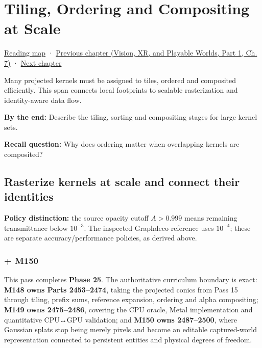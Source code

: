 \chapter{Tiling, Ordering and Compositing at Scale}\label{04-visual-computing-ii-ch039-tiling-ordering-and-compositing-at-scale}\hypertarget{04-visual-computing-ii-ch039}{}\label{stagechapter:04-visual-computing-ii-ch039}

\hypertarget{04-visual-computing-ii-ch039-tiling-ordering-and-compositing-at-scale}{}

\hyperref[volume-reading-map]{Reading map} · \href{../07-Vision-XR-and-Playable-Worlds-P01/main.pdf\#nameddest=04-visual-computing-ii-ch038-projecting-ellipsoids-into-screen-space-conics}{Previous chapter (Vision, XR, and Playable Worlds, Part 1, Ch. 7)} · \hyperref[04-visual-computing-ii-ch042]{Next chapter}

Many projected kernels must be assigned to tiles, ordered and composited efficiently. This span connects local footprints to scalable rasterization and identity-aware data flow.

\textbf{By the end:} Describe the tiling, sorting and compositing stages for large kernel sets.

\textbf{Recall question:} Why does ordering matter when overlapping kernels are composited?

\section{Rasterize kernels at scale and connect their identities}\label{04-visual-computing-ii-ch039-rasterize-kernels-at-scale-and-connect-their-identities}

\hypertarget{04-visual-computing-ii-ch039-rasterize-kernels-at-scale-and-connect-their-identities}{}

\textbf{Policy distinction:} the source opacity cutoff \(A>0.999\) means remaining transmittance below \(10^{-3}\). The inspected Graphdeco reference uses \(10^{-4}\); these are separate accuracy/performance policies, as derived above.

\subsection{+ M150}\label{04-visual-computing-ii-ch039-m150}

\hypertarget{04-visual-computing-ii-ch039-m150}{}

This pass completes \textbf{Phase 25}. The authoritative curriculum boundary is exact: \textbf{M148 owns Parts 2453--2474}, taking the projected conics from Pass 15 through tiling, prefix sums, reference expansion, ordering and alpha compositing; \textbf{M149 owns 2475--2486}, covering the CPU oracle, Metal implementation and quantitative CPU↔GPU validation; and \textbf{M150 owns 2487--2500}, where Gaussian splats stop being merely pixels and become an editable captured-world representation connected to persistent entities and physical degrees of freedom.


